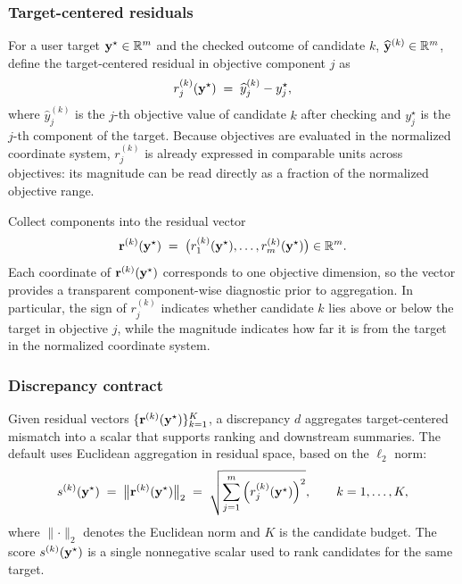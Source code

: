 \subsubsection{Target-centered residuals}\label{sec:eval_plausibility_z}

For a user target $\mathbf{y}^{\star}\in\mathbb{R}^{m}$ and the checked outcome of candidate $k$,
$\widehat{\mathbf{y}}^{(k)}\in\mathbb{R}^{m}$, define the target-centered residual in objective
component $j$ as
\begin{equation}
  r_j^{(k)}(\mathbf{y}^{\star})
  \;=\;
  \widehat{y}^{(k)}_j - y^{\star}_j,
  \label{eq:target_centered_residual}
\end{equation}
where $\widehat{y}^{(k)}_j$ is the $j$-th objective value of candidate $k$ after checking and $y^{\star}_j$
is the $j$-th component of the target. Because objectives are evaluated in the normalized coordinate
system, $r_j^{(k)}$ is already expressed in comparable units across objectives: its magnitude can be
read directly as a fraction of the normalized objective range.

Collect components into the residual vector
\begin{equation}
  \mathbf{r}^{(k)}(\mathbf{y}^{\star})
  \;=\;
  \big(r_1^{(k)}(\mathbf{y}^{\star}),\dots,r_m^{(k)}(\mathbf{y}^{\star})\big)\in\mathbb{R}^{m}.
  \label{eq:target_centered_residual_vector}
\end{equation}
Each coordinate of $\mathbf{r}^{(k)}(\mathbf{y}^{\star})$ corresponds to one objective dimension, so the
vector provides a transparent component-wise diagnostic prior to aggregation. In particular, the sign
of $r_j^{(k)}$ indicates whether candidate $k$ lies above or below the target in objective $j$, while
the magnitude indicates how far it is from the target in the normalized coordinate system.

\subsubsection{Discrepancy contract}\label{sec:eval_discrepancy_contract}

Given residual vectors $\{\mathbf{r}^{(k)}(\mathbf{y}^{\star})\}_{k=1}^{K}$, a discrepancy $d$ aggregates
target-centered mismatch into a scalar that supports ranking and downstream summaries. The default uses
Euclidean aggregation in residual space, based on the $\ell_2$ norm:
\begin{equation}
  s^{(k)}(\mathbf{y}^{\star})
  \;=\;
  \big\lVert \mathbf{r}^{(k)}(\mathbf{y}^{\star}) \big\rVert_2
  \;=\;
  \sqrt{\sum_{j=1}^{m}\Big(r^{(k)}_{j}(\mathbf{y}^{\star})\Big)^{2}},
  \qquad k=1,\dots,K,
  \label{eq:discrepancy_residual_euclid}
\end{equation}
where $\lVert \cdot \rVert_2$ denotes the Euclidean norm and $K$ is the candidate budget. The score
$s^{(k)}(\mathbf{y}^{\star})$ is a single nonnegative scalar used to rank candidates for the same target.

